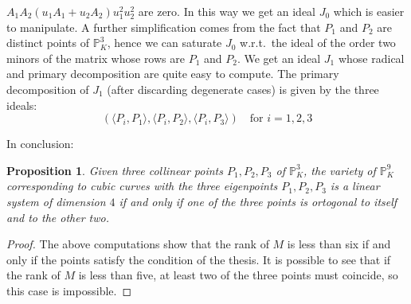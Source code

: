 \documentclass{amsart}
\theoremstyle{plain}
\newtheorem{prop}[theorem]{Proposition}
\theoremstyle{definition}
\newcommand{\scl}[2]{\langle #1, #2 \rangle}
\begin{document}
$A_1A_2(u_1A_1+u_2A_2)u_1^2u_2^2$ are zero. In this way we get an ideal
$J_0$ which is easier to manipulate. A further simplification comes
from the fact that $P_1$ and $P_2$ are distinct points of $\mathbb{P}^3_K$,
hence we can saturate $J_0$ w.r.t.\ the ideal of the order two minors of
the matrix whose rows are $P_1$ and $P_2$. We get an ideal
$J_1$ whose radical and primary decomposition are quite easy to compute.
The primary decomposition of $J_1$ (after discarding 
degenerate cases) is given by the three ideals:
\[
\left(\scl{P_i}{P_1}, \scl{P_i}{P_2},\scl{P_i}{P_3}\right) \quad
\mbox{for $i = 1, 2, 3$}
\]



In conclusion:
\begin{prop}
  Given three collinear points $P_1, P_2, P_3$ of
  $\mathbb{P}^3_K$, the variety of $\mathbb{P}^9_K$ corresponding
  to cubic curves with the three eigenpoints $P_1, P_2, P_3$
  is a linear system of dimension $4$ if and only if 
  one of the three points is ortogonal to itself and to the other two.
\label{prototipo}
\end{prop}
\begin{proof}
  The above
  computations show that the rank of $M$ is less than six if and only
  if the points satisfy the condition of the thesis. It is possible
  to see that if the rank of $M$ is less than five, at least two of the
  three points must coincide, so this case is impossible.
\end{proof}
\end{document}
